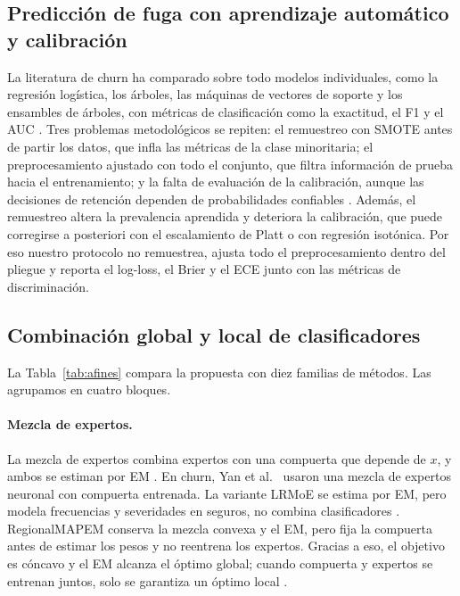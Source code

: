 \documentclass[11pt,a4paper]{article}
\begin{document}
\subsection{Predicción de fuga con aprendizaje automático y calibración}
La literatura de churn ha comparado sobre todo modelos individuales, como la regresión logística, los árboles, las máquinas de vectores de soporte y los ensambles de árboles, con métricas de clasificación como la exactitud, el F1 y el AUC \cite{vafeiadis2015}. Tres problemas metodológicos se repiten: el remuestreo con SMOTE antes de partir los datos, que infla las métricas de la clase minoritaria; el preprocesamiento ajustado con todo el conjunto, que filtra información de prueba hacia el entrenamiento; y la falta de evaluación de la calibración, aunque las decisiones de retención dependen de probabilidades confiables \cite{roy2026}. Además, el remuestreo altera la prevalencia aprendida y deteriora la calibración, que puede corregirse a posteriori con el escalamiento de Platt o con regresión isotónica. Por eso nuestro protocolo no remuestrea, ajusta todo el preprocesamiento dentro del pliegue y reporta el log-loss, el Brier y el ECE junto con las métricas de discriminación.

\subsection{Combinación global y local de clasificadores}
La Tabla~\ref{tab:afines} compara la propuesta con diez familias de métodos. Las agrupamos en cuatro bloques.

\paragraph{Mezcla de expertos.} La mezcla de expertos combina expertos con una compuerta que depende de $x$, y ambos se estiman por EM \cite{jacobs1991,jordan1994}. En churn, Yan et al.\ \cite{yan2001} usaron una mezcla de expertos neuronal con compuerta entrenada. La variante LRMoE se estima por EM, pero modela frecuencias y severidades en seguros, no combina clasificadores \cite{fung2019}. RegionalMAPEM conserva la mezcla convexa y el EM, pero fija la compuerta antes de estimar los pesos y no reentrena los expertos. Gracias a eso, el objetivo es cóncavo y el EM alcanza el óptimo global; cuando compuerta y expertos se entrenan juntos, solo se garantiza un óptimo local \cite{wu1983}.
\end{document}
